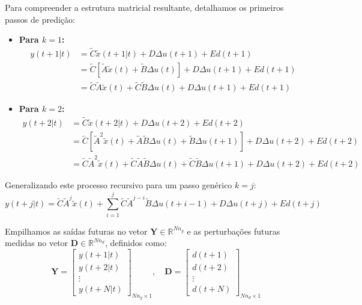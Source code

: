 \documentclass[12pt]{article}
\begin{document}
Para compreender a estrutura matricial resultante, detalhamos os primeiros passos de predição:
\begin{itemize}
    \item {\bf Para $k=1$:}
    \begin{align}
    y(t+1|t) &= \tilde{C} \tilde{x}(t+1|t) + D \Delta u(t+1) + E d(t+1) \nonumber \\
             &= \tilde{C} \left[ \tilde{A} \tilde{x}(t) + \tilde{B} \Delta u(t) \right] + D \Delta u(t+1) + E d(t+1) \nonumber \\
             &= \tilde{C}\tilde{A} \tilde{x}(t) + \tilde{C}\tilde{B} \Delta u(t) + D \Delta u(t+1) + E d(t+1)
    \end{align}
    
    \item {\bf Para $k=2$:}
    \begin{align}
    y(t+2|t) &= \tilde{C} \tilde{x}(t+2|t) + D \Delta u(t+2) + E d(t+2) \nonumber \\
             &= \tilde{C} \left[ \tilde{A}^2 \tilde{x}(t) + \tilde{A}\tilde{B} \Delta u(t) + \tilde{B} \Delta u(t+1) \right] + D \Delta u(t+2) + E d(t+2) \nonumber \\
             &= \tilde{C}\tilde{A}^2 \tilde{x}(t) + \tilde{C}\tilde{A}\tilde{B} \Delta u(t) + \tilde{C}\tilde{B} \Delta u(t+1) + D \Delta u(t+2) + E d(t+2)
    \end{align}
\end{itemize}

Generalizando este processo recursivo para um passo genérico $k = j$:
\begin{equation}
y(t+j|t) = \tilde{C}\tilde{A}^j \tilde{x}(t) + \sum_{i=1}^j \tilde{C}\tilde{A}^{j-i}\tilde{B}\Delta u(t+i-1) + D\Delta u(t+j) + E d(t+j)
\end{equation}

Empilhamos as saídas futuras no vetor $\bm{Y} \in \mathbb{R}^{N n_y}$ e as perturbações futuras medidas no vetor $\bm{D} \in \mathbb{R}^{N n_d}$, definidos como:
\begin{equation}
\bm{Y} = \begin{bmatrix} y(t+1|t) \\ y(t+2|t) \\ \vdots \\ y(t+N|t) \end{bmatrix}_{N n_y \times 1}, \quad
\bm{D} = \begin{bmatrix} d(t+1) \\ d(t+2) \\ \vdots \\ d(t+N) \end{bmatrix}_{N n_d \times 1}
\end{equation}
\end{document}
